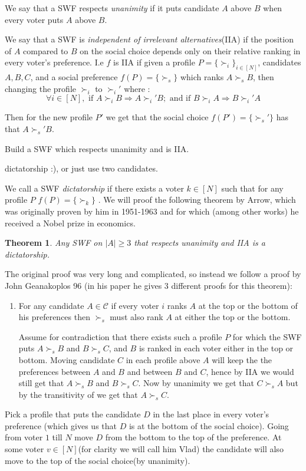 \documentclass[a4paper,11pt]{exam}
\newtheorem{theorem}{Theorem}
\begin{document}
\begin{questions}
We say that a SWF respects \emph{unanimity} if it puts candidate $A$ above $B$ when every voter puts $A$ above $B$.  

We say that a SWF is \emph{independent of irrelevant alternatives}(IIA) if the position of $A$ compared to $B$ on the social choice depends only on their relative ranking in every voter's preference. I.e $f$ is IIA  if given a profile $P=\{\succ_i\}_{i\in[N]}$, candidates $A,B,C$, and a social preference $ f(P) = \{\succ_s\} $ which ranks $A\succ_s B$, then changing the profile $\succ_i$ to $\succ_i'$ where :
\[
	\forall i\in[N],\text{ if } A\succ_i B \Rightarrow A\succ_i' B; \text{ and if }B\succ_i A \Rightarrow B\succ_i' A
\]

Then for the new profile $P'$ we get that the social choice $ f(P') = \{\succ_s'\} $ has that $A\succ_s' B$.  

\question
Build a SWF which respects unanimity and is IIA.

\begin{solution}
	dictatorship :), or just use two candidates.
\end{solution}  

We call a SWF \emph{dictatorship} if there exists a voter $k\in[N]$ such that for any profile $P$ $f(P)=\{\succ_k\}$ .
\question
We will proof the following theorem by Arrow, which was originally proven by him in 1951-1963 and for which (among other works) he received a Nobel prize in economics.
\begin{theorem}
	Any SWF on $|A|\geq 3$ that respects unanimity and IIA is a dictatorship.  
\end{theorem}
The original proof was very long and complicated, so instead we follow a proof by John Geanakoplos 96 (in his paper he gives 3 different proofs for this theorem):
\begin{enumerate}
	\item  For any candidate $A\in\mathcal{C}$ if every voter $i$ ranks $A$ at the top or the bottom of his preferences then $\succ_s$ must  also rank $A$ at either the top or the bottom.  
	\begin{solution}
		Assume for contradiction that there exists such a profile $P$ for which the SWF puts $A\succ_s B$ and $B\succ_s C$, and $B$ is ranked in each voter either in the top or bottom. Moving candidate $C$ in each profile above $A$ will keep the the preferences between $A$ and $B$ and between $B$ and $C$, hence by IIA  we would still get that $A\succ_s B$ and $B\succ_s C$. Now by unanimity we get that $C\succ_s A$ but by the transitivity of we get that $A\succ_s C$.     
	\end{solution}
\end{enumerate}
Pick a profile that puts the candidate $D$ in the last place in every voter's preference (which gives us that $D$ is at the bottom of the social choice). Going from voter $1$ till $N$ move $D$ from the bottom to the top of the preference. At some voter $v\in[N]$(for clarity we will call him Vlad) the candidate will also move to the top of the social choice(by unanimity). 


\end{questions}
\end{document}
